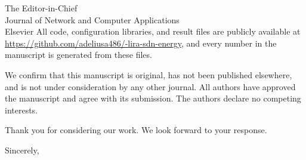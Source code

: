 \documentclass[11pt,a4paper]{letter}
\begin{document}
\begin{letter}{The Editor-in-Chief\\Journal of Network and Computer Applications\\Elsevier}
All code, configuration libraries, and result files are publicly available at \url{https://github.com/adeliusa486/-lira-sdn-energy}, and every number in the manuscript is generated from these files.

We confirm that this manuscript is original, has not been published elsewhere, and is not under consideration by any other journal. All authors have approved the manuscript and agree with its submission. The authors declare no competing interests.

Thank you for considering our work. We look forward to your response.

\closing{Sincerely,}
\end{letter}
\end{document}
